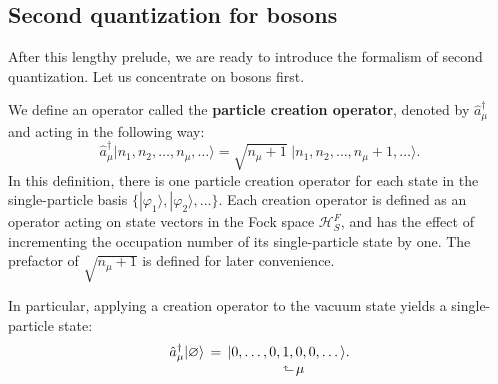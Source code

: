 \documentclass[pra,12pt]{revtex4}
\begin{document}
\subsection{Second quantization for bosons}
\label{sec:second_quantized_bosons}

After this lengthy prelude, we are ready to introduce the formalism of
second quantization.  Let us concentrate on bosons first.  

We define an operator called the \textbf{particle creation operator},
denoted by $\hat{a}_\mu^\dagger$ and acting in the following way:
\begin{equation}
  \hat{a}_\mu^\dagger \big|n_1, n_2, \dots, n_\mu, \dots\big\rangle = \sqrt{n_\mu+1} \; \big|n_1, n_2, \dots, n_\mu + 1, \dots\big\rangle.
\end{equation}
In this definition, there is one particle creation operator for each
state in the single-particle basis
$\{|\varphi_1\rangle,|\varphi_2\rangle,\dots\}$.  Each creation operator is
defined as an operator acting on state vectors in the Fock space
$\mathscr{H}^F_S$, and has the effect of incrementing the occupation
number of its single-particle state by one.  The prefactor of
$\sqrt{n_\mu+1}$ is defined for later convenience.

In particular, applying a creation operator to the vacuum state yields
a single-particle state:
\begin{align}
  \begin{aligned}\hat{a}_\mu^\dagger |\varnothing\rangle \, &= \, |0,\dots,0, 1, 0, 0, \dots\rangle. \\[-1ex] &\qquad\qquad\quad\;\;\rotatebox[origin=c]{90}{$\Rsh$}\,\mu
  \end{aligned}
\end{align}
\end{document}
